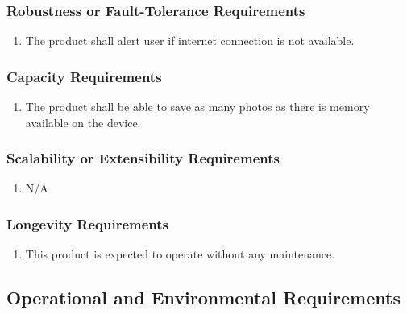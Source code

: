 \documentclass[]{article}
\begin{document}
\subsubsection{Robustness or Fault-Tolerance Requirements}
\label{ssub:robustness_or_fault_tolerance_requirements}
\begin{enumerate}[{PR}1. ]
	\item The product shall alert user if internet connection is not available. %
\end{enumerate}

\subsubsection{Capacity Requirements}
\label{ssub:capacity_requirements}
\begin{enumerate}[{PR}1. ]
	\item The product shall be able to save as many photos as there is memory available on the device. %
\end{enumerate}

\subsubsection{Scalability or Extensibility Requirements}
\label{ssub:scalability_or_extensibility_requirements}
\begin{enumerate}[{PR}1. ]
	\item N/A
\end{enumerate}

\subsubsection{Longevity Requirements}
\label{ssub:longevity_requirements}
\begin{enumerate}[{PR}1. ]
	\item This product is expected to operate without any maintenance.
\end{enumerate}


\subsection{Operational and Environmental Requirements}
\label{sub:operational_and_environmental_requirements}
\end{document}
